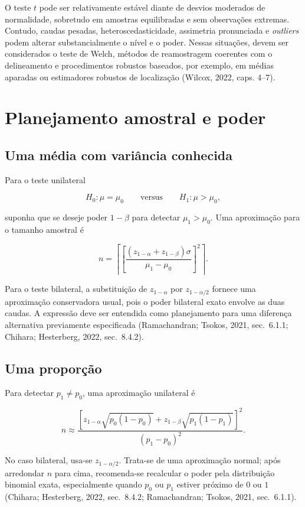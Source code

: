 \documentclass[
  letterpaper,
  DIV=11,
  numbers=noendperiod]{scrreprt}
\begin{document}
O teste \(t\) pode ser relativamente estável diante de desvios moderados
de normalidade, sobretudo em amostras equilibradas e sem observações
extremas. Contudo, caudas pesadas, heteroscedasticidade, assimetria
pronunciada e \emph{outliers} podem alterar substancialmente o nível e o
poder. Nessas situações, devem ser considerados o teste de Welch,
métodos de reamostragem coerentes com o delineamento e procedimentos
robustos baseados, por exemplo, em médias aparadas ou estimadores
robustos de localização (Wilcox, 2022, caps. 4--7).

\section{Planejamento amostral e
poder}\label{planejamento-amostral-e-poder}

\subsection{Uma média com variância
conhecida}\label{uma-muxe9dia-com-variuxe2ncia-conhecida-1}

Para o teste unilateral

\[H_0:\mu=\mu_0
\qquad\text{versus}\qquad
H_1:\mu>\mu_0,\]

suponha que se deseje poder \(1-\beta\) para detectar \(\mu_1>\mu_0\).
Uma aproximação para o tamanho amostral é

\[n
=
\left\lceil
\left[
\frac{(z_{1-\alpha}+z_{1-\beta})\sigma}
{\mu_1-\mu_0}
\right]^2
\right\rceil.\]

Para o teste bilateral, a substituição de \(z_{1-\alpha}\) por
\(z_{1-\alpha/2}\) fornece uma aproximação conservadora usual, pois o
poder bilateral exato envolve as duas caudas. A expressão deve ser
entendida como planejamento para uma diferença alternativa previamente
especificada (Ramachandran; Tsokos, 2021, sec.~6.1.1; Chihara;
Hesterberg, 2022, sec.~8.4.2).

\subsection{Uma proporção}\label{uma-proporuxe7uxe3o-1}

Para detectar \(p_1\neq p_0\), uma aproximação unilateral é

\[n
\approx
\frac{
\left[
 z_{1-\alpha}\sqrt{p_0(1-p_0)}
 +z_{1-\beta}\sqrt{p_1(1-p_1)}
\right]^2
}{(p_1-p_0)^2}.\]

No caso bilateral, usa-se \(z_{1-\alpha/2}\). Trata-se de uma
aproximação normal; após arredondar \(n\) para cima, recomenda-se
recalcular o poder pela distribuição binomial exata, especialmente
quando \(p_0\) ou \(p_1\) estiver próximo de \(0\) ou \(1\) (Chihara;
Hesterberg, 2022, sec.~8.4.2; Ramachandran; Tsokos, 2021, sec.~6.1.1).
\end{document}
